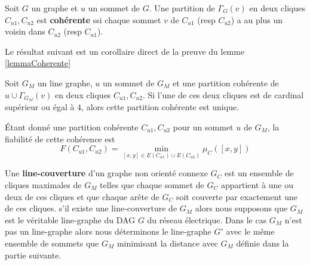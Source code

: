 \begin{definition}
Soit $G$ un graphe et $u$ un sommet de $G$. Une partition de $\Gamma_G(v)$ en deux cliques $C_{u1}, C_{u2}$ est {\bf coh\'erente } ssi chaque sommet $v$ de $C_{u1}$ (resp $C_{u2}$) a au plus un voisin dans $C_{u2}$  (resp $C_{u1}$).
\end{definition}
Le r\'esultat suivant est un corollaire direct de la preuve du lemme \ref{lemmaCoherente}
\begin{lemma}
\label{lemmaCoherente}
Soit $G_M$ un line graphe, $u$ un sommet de $G_M$ et une partition coh\'erente de ${u} \cup \Gamma_{G_M}(v)$ en deux cliques  $C_{u1}, C_{u2}$. 
Si l'une de ces deux cliques est de cardinal sup\'erieur ou \'egal \`a $4$, alors cette partition coh\'erente est unique.
\end{lemma}

\'Etant donn\'e une partition coh\'erente $C_{u1}, C_{u2}$ pour un sommet $u$ de $G_M$, la fiabilit\'e de cette coh\'erence est
$$F(C_{u1}, C_{u2}) = \min\limits_{[x,y] \in E(C_{u1}) \cup E(C_{u2})}  \mu_{C}([x,y])$$


Une {\bf line-couverture} d'un graphe non orient\'e connexe $G_C$ est un ensemble de cliques maximales de $G_M$ telles que chaque sommet de $G_C$ appartient \`a une ou deux de ces cliques et que chaque ar\^ete de $G_C$ soit couverte par exactement une de ces cliques.
s'il existe une line-couverture de $G_M$ alors nous supposons que $G_M$ est le v\'eritable  line-graphe du DAG $G$ du r\'eseau \'electrique.
Dans le cas $G_M$ n'est pas un line-graphe alors nous d\'eterminons le line-graphe $G'$ avec le m\^eme ensemble de sommets que $G_M$ minimisant la distance avec $G_M$ d\'efinie dans la partie suivante.
